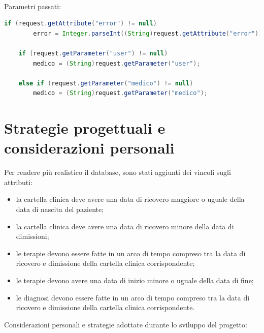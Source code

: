 \documentclass[a4paper,titlepage]{article}
\begin{document}
~

Parametri passati: 
\begin{lstlisting}[language=java]
    if (request.getAttribute("error") != null)
    	error = Integer.parseInt((String)request.getAttribute("error"));
    
    if (request.getParameter("user") != null)
	    medico = (String)request.getParameter("user");

    else if (request.getParameter("medico") != null)
	    medico = (String)request.getParameter("medico");
\end{lstlisting}

\part{Strategie progettuali e considerazioni personali}

Per rendere più realistico il database, sono stati aggiunti dei vincoli sugli attributi:

\begin{itemize}[leftmargin=1.5cm, topsep=0.5cm, itemsep=0.2cm]

\item la cartella clinica deve avere una data di ricovero maggiore o uguale della data di nascita del paziente;

\item la cartella clinica deve avere una data di ricovero minore della data di dimissioni;

\item le terapie devono essere fatte in un arco di tempo compreso tra la data di ricovero e dimissione della cartella clinica corrispondente;

\item le terapie devono avere una data di inizio minore o uguale della data di fine;

\item le diagnosi devono essere fatte in un arco di tempo compreso tra la data di ricovero e dimissione della cartella clinica corrispondente.

\end{itemize}

Considerazioni personali e strategie adottate durante lo sviluppo del progetto:
\end{document}
